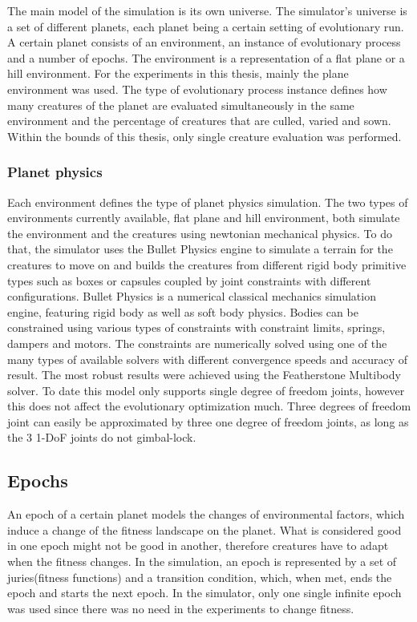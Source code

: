 \documentclass[main]{subfiles}
\begin{document}
The main model of the simulation is its own universe. The simulator's universe is a set of different planets, each planet being a certain setting of evolutionary run.  A certain planet consists of an environment, an instance of evolutionary process and a number of epochs. The environment is a representation of a flat plane or a hill environment. For the experiments in this thesis, mainly the plane environment was used. The type of evolutionary process instance defines how many creatures of the planet are evaluated simultaneously in the same environment and the percentage of creatures that are culled, varied and sown. Within the bounds of this thesis, only single creature evaluation was performed. 

\subsubsection{Planet physics}

Each environment defines the type of planet physics simulation. The two types of environments currently available, flat plane and hill environment, both simulate the environment and the creatures using newtonian mechanical physics. To do that, the simulator uses the Bullet Physics engine\cite{bib:BulletPhysics2015} to simulate a terrain for the creatures to move on and builds the creatures from different rigid body primitive types such as boxes or capsules coupled by joint constraints with different configurations. Bullet Physics is a numerical classical mechanics simulation engine, featuring rigid body as well as soft body physics. Bodies can be constrained using various types of constraints with constraint limits, springs, dampers and motors. The constraints are numerically solved using one of the many types of available solvers with different convergence speeds and accuracy of result. The most robust results were achieved using the Featherstone Multibody solver. To date this model only supports single degree of freedom joints, however this does not affect the evolutionary optimization much. Three degrees of freedom joint can easily be approximated by three one degree of freedom joints, as long as the 3 1-DoF joints do not gimbal-lock.

\subsection{Epochs}

An epoch of a certain planet models the changes of environmental factors, which induce a change of the fitness landscape on the planet. What is considered good in one epoch might not be good in another, therefore creatures have to adapt when the fitness changes. In the simulation, an epoch is represented by a set of juries(fitness functions) and a transition condition, which, when met, ends the epoch and starts the next epoch. In the simulator, only one single infinite epoch was used since there was no need in the experiments to change fitness.
\end{document}
